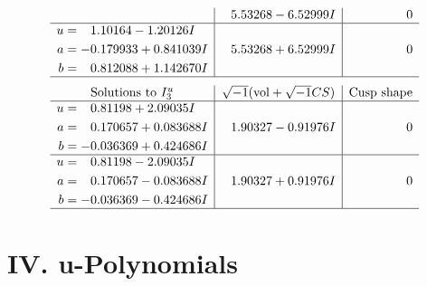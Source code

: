 \documentclass[1p]{elsarticle_modified}
\theoremstyle{definition}
\newcommand{\I}{\sqrt{-1}}
\begin{document}
$$\begin{array}{c|c|c}
 & \phantom{-}5.53268 - 6.52999 I & \phantom{-0.000000 } 0 \\ \hline\begin{aligned}
u &= \phantom{-}1.10164 - 1.20126 I \\
a &= -0.179933 + 0.841039 I \\
b &= \phantom{-}0.812088 + 1.142670 I\end{aligned}
 & \phantom{-}5.53268 + 6.52999 I & \phantom{-0.000000 } 0\\
 \hline 
 \end{array}$$\newpage$$\begin{array}{c|c|c}  
\text{Solutions to }I^u_{3}& \I (\text{vol} + \sqrt{-1}CS) & \text{Cusp shape}\\
 \hline 
\begin{aligned}
u &= \phantom{-}0.81198 + 2.09035 I \\
a &= \phantom{-}0.170657 + 0.083688 I \\
b &= -0.036369 + 0.424686 I\end{aligned}
 & \phantom{-}1.90327 - 0.91976 I & \phantom{-0.000000 } 0 \\ \hline\begin{aligned}
u &= \phantom{-}0.81198 - 2.09035 I \\
a &= \phantom{-}0.170657 - 0.083688 I \\
b &= -0.036369 - 0.424686 I\end{aligned}
 & \phantom{-}1.90327 + 0.91976 I & \phantom{-0.000000 } 0\\
 \hline 
 \end{array}$$\newpage
\newpage\renewcommand{\arraystretch}{1}
\centering \section*{ IV. u-Polynomials}
\end{document}
